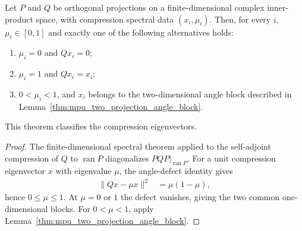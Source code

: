 \begin{lemma}
    \label{thm:mpu_two_projection_compression_spectrum}
    \leanok
    Let $P$ and $Q$ be orthogonal projections on a finite-dimensional complex
    inner-product space, with compression spectral data $(x_i,\mu_i)$. Then, for
    every $i$, $\mu_i\in[0,1]$ and exactly one of the following alternatives
    holds:
    \begin{enumerate}
        \item $\mu_i=0$ and $Qx_i=0$;
        \item $\mu_i=1$ and $Qx_i=x_i$;
        \item $0<\mu_i<1$, and $x_i$ belongs to the two-dimensional angle block
              described in Lemma~\ref{thm:mpu_two_projection_angle_block}.
    \end{enumerate}
    This theorem classifies the compression eigenvectors.
\end{lemma}

\begin{proof}\leanok
    The finite-dimensional spectral theorem applied to the self-adjoint compression
    of $Q$ to $\operatorname{ran}P$ diagonalizes $PQP|_{\operatorname{ran}P}$. For a unit compression eigenvector $x$ with
    eigenvalue $\mu$, the angle-defect identity gives
    \begin{align}
        \lVert Qx-\mu x\rVert^2 & =\mu(1-\mu),
    \end{align}
    hence $0\leq\mu\leq1$. At $\mu=0$ or $1$ the defect vanishes, giving the two
    common one-dimensional blocks. For $0<\mu<1$, apply
    Lemma~\ref{thm:mpu_two_projection_angle_block}.
\end{proof}

